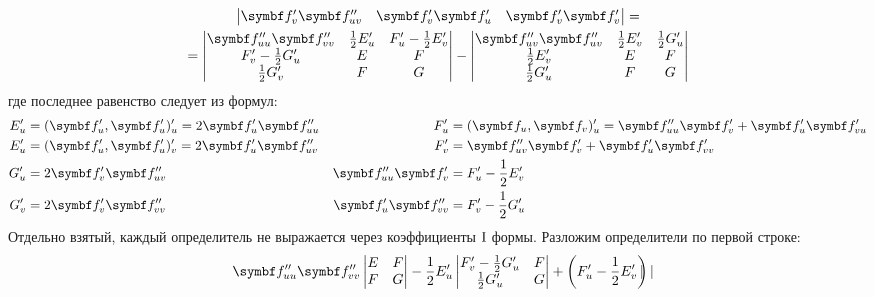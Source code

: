 \documentclass[main]{subfiles}
\begin{document}
\begin{longProof}
\begin{multline*}
\begin{vmatrix}
            \vf'_v \vf''_{uv}     & \vf'_v\vf'_u      & \vf'_v \vf'_v
        \end{vmatrix}= \\
        = \begin{vmatrix}
            \vf''_{uu} \vf''_{vv}  & \frac{1}{2}E'_u & F'_u - \frac{1}{2}E'_v \\
            F'_v - \frac{1}{2}G'_u & E               & F                      \\
            \frac{1}{2}G'_v        & F               & G
        \end{vmatrix}-
        \begin{vmatrix}
            \vf''_{uv}\vf''_{uv} & \frac{1}{2} E'_v & \frac{1}{2} G'_u \\
            \frac{1}{2} E'_v     & E                & F                \\
            \frac{1}{2} G'_u     & F                & G
        \end{vmatrix}
    \end{multline*}
    где последнее равенство следует из формул:
    \begin{align*}
        E'_u & = (\vf'_u, \vf'_u)'_u = 2\vf'_u \vf''_{uu} & F'_u              & = (\vf_u, \vf_v)'_u = \vf''_{uu}\vf'_v + \vf'_u \vf'_{vu} \\
        E'_u & = (\vf'_u, \vf'_u)'_v = 2\vf'_u \vf''_{uv} & F'_v              & = \vf''_{uv}\vf'_v + \vf'_u \vf'_{vv}                     \\
        G'_u & = 2 \vf'_v \vf''_{uv}                      & \vf''_{uu}\vf'_v  & = F'_u - \frac{1}{2}E'_v                                  \\
        G'_v & = 2 \vf'_v \vf''_{vv}                      & \vf'_u \vf''_{vv} & = F'_v - \frac{1}{2}G'_u
    \end{align*}
    Отдельно взятый, каждый определитель не выражается через коэффициенты $\mathrm{I}$ формы.
    Разложим определители по первой строке:
    \begin{multline*}
        \vf''_{uu} \vf''_{vv} \begin{vmatrix}
            E & F \\
            F & G
        \end{vmatrix}
        - \frac{1}{2} E'_u \begin{vmatrix}
            F'_v - \frac{1}{2}G'_u & F \\
            \frac{1}{2}G'_u        & G
        \end{vmatrix}
        + \left(F'_u - \frac{1}{2} E'_v\right) \begin{vmatrix}

\end{vmatrix}
\end{multline*}
\end{longProof}
\end{document}
